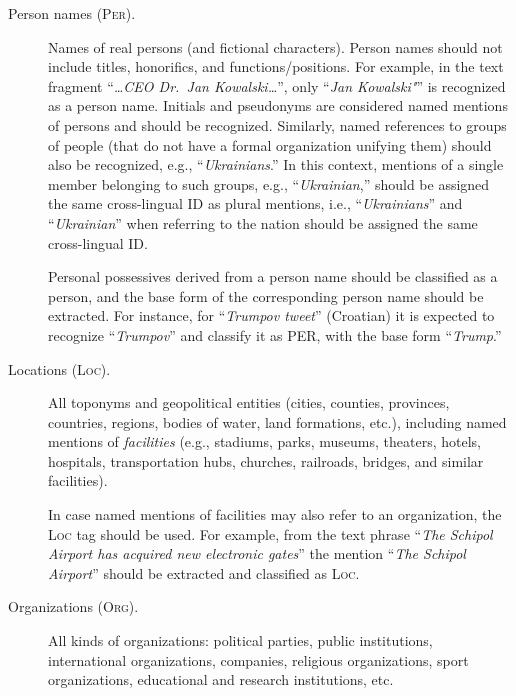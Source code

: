 \documentclass[11pt]{article}
\begin{document}
\begin{description}

\item[Person names (\textsc{Per}).] 
  
  {Names of real persons (and fictional characters).} Person
  names should not include titles, honorifics, and functions/positions. For example, in the
  text fragment ``\textit{\dots CEO Dr.~Jan Kowalski\dots}'', only ``\textit{Jan Kowalski"}'' is
  recognized as a person name.  Initials and pseudonyms are considered named mentions of
  persons and should be recognized.  Similarly, named references to groups of people (that do
  not have a formal organization unifying them) should also be recognized, e.g.,
  ``\textit{Ukrainians}.'' In this context, mentions of a single member belonging to such
  groups, e.g., ``\textit{Ukrainian},'' should be assigned the same cross-lingual ID as plural
  mentions, i.e., ``\textit{Ukrainians}'' and ``\textit{Ukrainian}'' when referring to the
  nation should be assigned the same cross-lingual ID.

  Personal possessives derived from a person name should be classified as a person, and the
  base form of the corresponding person name should be extracted. For instance, for
  ``\textit{Trumpov tweet}'' (Croatian) it is expected to recognize ``\textit{Trumpov}'' and
  classify it as PER, with the base form ``\textit{Trump}.''


\item[Locations (\textsc{Loc}).]

  All toponyms and geopolitical entities (cities, counties, provinces, countries, regions,
  bodies of water, land formations, etc.), including named mentions of {\em facilities} (e.g.,
  stadiums, parks, museums, theaters, hotels, hospitals, transportation hubs, churches,
  railroads, bridges, and similar facilities).

  In case named mentions of facilities may also refer to an organization, the \textsc{Loc} tag
  should be used.  For example, from the text phrase ``\textit{The Schipol Airport has
    acquired new electronic gates}'' the mention ``\textit{The Schipol Airport}'' should be
  extracted and classified as \textsc{Loc}.

\item[Organizations (\textsc{Org}).]

  All kinds of organizations: political parties, public institutions, international
  organizations, companies, religious organizations, sport organizations, educational and
  research institutions, etc.


\end{description}
\end{document}
